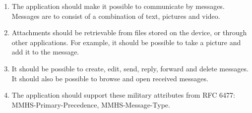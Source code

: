 \begin{enumerate}
\begin{enumerate}
\item{}The application should make it possible to communicate by messages. Messages are to consist of a combination of text, pictures and video.
\item{}Attachments should be retrievable from files stored on the device, or through other applications. For example, it should be possible to take a picture and add it to the message.
\item{}It should be possible to create, edit, send, reply, forward and delete messages. It should also be possible to browse and open received messages.
\item{}The application should support these military attributes from RFC 6477: MMHS-Primary-Precedence, MMHS-Message-Type.

\newpage


\end{enumerate}
\end{enumerate}
